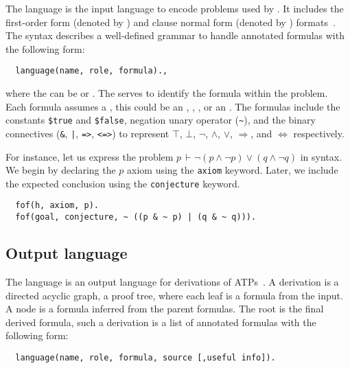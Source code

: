 \documentclass[../main.tex]{subfiles}
\begin{document}
The \TPTP language is the input language to encode problems used by \Metis.
It includes the first-order form (denoted by ) and clause normal form (denoted by ) formats~\cite{sutcliffe2009}.
The \TPTP syntax describes a well-defined grammar to handle annotated
formulas with the following form:

\begin{verbatim}
  language(name, role, formula).,
\end{verbatim}

where the  can be  or . The 
serves to identify the formula within the problem. Each formula
assumes a , this could be an ,
, ,  or an .
The formulas include the constants \verb!$true! and \verb!$false!, negation
unary operator (\verb!~!), and the binary connectives (\verb!&!, \verb!|!,
\verb!=>!, \verb!<=>!) to represent $⊤$, $⊥$, $¬$, $∧$, $∨$, $⇒$,
and $⇔$ respectively.

\begin{myexamplenum}
For instance, let us express the problem
$p\, ⊢ ¬  (p ∧ ¬ p) ∨ (q ∧ ¬ q)$
in \TPTP syntax. We begin by declaring the $p$ axiom using the \verb!axiom!
keyword. Later, we include the expected conclusion using the
\verb!conjecture! keyword.

\begin{verbatim}
  fof(h, axiom, p).
  fof(goal, conjecture, ~ ((p & ~ p) | (q & ~ q))).
\end{verbatim}

\end{myexamplenum}


\subsection{Output language}
\label{ssec:output-language}

The \TSTP language is an output language for derivations of
ATPs~\cite{Sutcliffe-Schulz-Claessen-VanGelder-2006}.
A \TSTP derivation is a directed acyclic graph, a proof tree,
where each leaf is a formula from the \TPTP input. A node is a formula
inferred from the parent formulas. The root is the final derived formula,
such a derivation is a list of annotated formulas with the following form:

\begin{verbatim}
  language(name, role, formula, source [,useful info]).
\end{verbatim}
\end{document}
